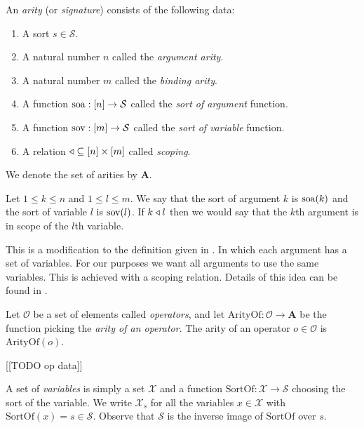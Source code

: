 \begin{defin}[Arity]
    An \emph{arity} (or \emph{signature}) consists of the following data:
    \begin{enumerate}
        \setlength{\itemsep}{0pt}
        \item A sort $s \in \mathcal{S}$.
        \item A natural number $n$ called the \emph{argument arity}.
        \item A natural number $m$ called the \emph{binding arity}.
        \item A function $\text{soa} : [n] \to \mathcal{S}$ called the \emph{sort of argument} function.
        \item A function $\text{sov} : [m] \to \mathcal{S}$ called the \emph{sort of variable} function.
        \item A relation $\triangleleft \subseteq [n] \times [m]$ called \emph{scoping}.
    \end{enumerate}
    We denote the set of arities by $\mathbf{A}$.
\end{defin}

\begin{remark}
    Let $1 \le k \le n$ and $1 \le l \le m$. We say that the sort of argument $k$ is $\text{soa}(k)$ and the sort of variable $l$ is $\text{sov}(l)$. If $k \triangleleft l$ then we would say that the $k$th argument is in scope of the $l$th variable.
\end{remark}

\begin{remark}
    This is a modification to the definition given in \cite{harper_2016}. In which each argument has a set of variables. For our purposes we want all arguments to use the same variables. This is achieved with a scoping relation. Details of this idea can be found in \cite{nlab:initiality_project_-_raw_syntax}.
\end{remark}

\begin{defin}\label{op}
    Let $\mathcal{O}$ be a set of elements called \emph{operators}, and let $\mathrm{ArityOf} : \mathcal{O} \to \mathbf{A}$ be the function picking the \emph{arity of an operator}. The arity of an operator $o\in \mathcal{O}$ is $\mathrm{ArityOf}(o)$.
\end{defin}

\begin{remark}\label{opdata}
    [[TODO op data]]
\end{remark}

\begin{defin}\label{variables}
    A set of \emph{variables} is simply a set $\mathcal{X}$ and a function $\mathrm{SortOf} : \mathcal{X} \to \mathcal{S}$ choosing the sort of the variable. We write $\mathcal{X}_s$ for all the variables $x \in \mathcal{X}$ with $\mathrm{SortOf}(x) = s \in \mathcal{S}$. Observe that $\mathcal{S}$ is the inverse image of $\mathrm{SortOf}$ over $s$.
\end{defin}

